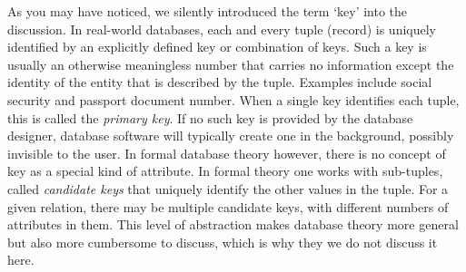 As you may have noticed, we silently introduced the term `key' into the
discussion.  In real-world databases, each and every tuple (record) is uniquely
identified by an explicitly defined key or combination of keys. Such a key is
usually an otherwise meaningless number that carries no information except the
identity of the entity that is described by the tuple. Examples include social
security and passport document number. When a single key identifies each tuple,
this is called the \emph{primary key}. If no such key is provided by the
database designer, database software will typically create one in the
background, possibly invisible to the user. In formal database theory however,
there is no concept of key as a special kind of attribute. In formal theory one
works with sub-tuples, called \emph{candidate keys} that uniquely identify the
other values in the tuple. For a given relation, there may be multiple
candidate keys, with different numbers of attributes in them. This level of
abstraction makes database theory more general but also more cumbersome to
discuss, which is why they we do not discuss it here.


